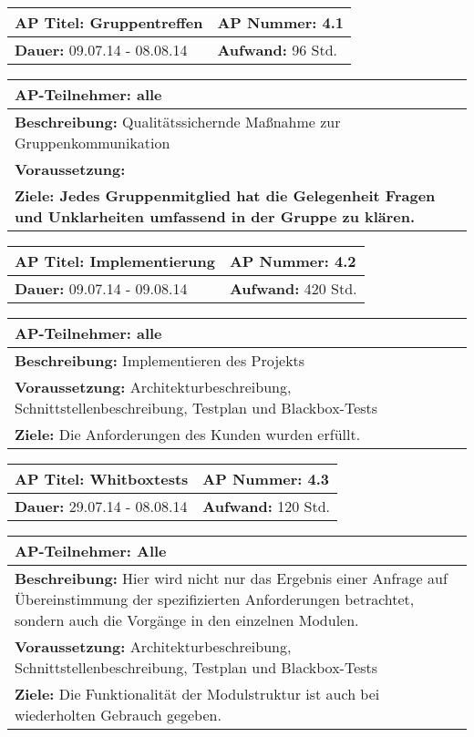 \begin{tabular}{|p{7.43cm}|p{7.43cm}|}
\hline
\textbf{AP Titel: }Gruppentreffen & \textbf{AP Nummer: }4.1\\ 
\hline
\textbf{Dauer: }09.07.14 - 08.08.14& \textbf{Aufwand: } 96 Std.\\
\hline
\end{tabular}
\begin{tabular}{|p{15.3cm}|}
\hline
\textbf{AP-Teilnehmer: }alle\\
\hline
\textbf{Beschreibung: }Qualitätssichernde Maßnahme zur Gruppenkommunikation\\
\hline
\textbf{Voraussetzung: } \\
\hline 
\textbf{Ziele: Jedes Gruppenmitglied hat die Gelegenheit Fragen und Unklarheiten umfassend in der Gruppe zu klären.}\\
\hline 
\end{tabular}

\begin{tabular}{|p{7.43cm}|p{7.43cm}|}
\hline
\textbf{AP Titel: }Implementierung & \textbf{AP Nummer: }4.2\\ 
\hline
\textbf{Dauer: }09.07.14 - 09.08.14& \textbf{Aufwand: } 420 Std.\\
\hline
\end{tabular}
\begin{tabular}{|p{15.3cm}|}
\hline
\textbf{AP-Teilnehmer: }alle\\
\hline
\textbf{Beschreibung: }Implementieren des Projekts\\
\hline
\textbf{Voraussetzung: }Architekturbeschreibung, Schnittstellenbeschreibung, Testplan und Blackbox-Tests \\
\hline 
\textbf{Ziele: }Die Anforderungen des Kunden wurden erfüllt.\\
\hline 
\end{tabular}

\begin{tabular}{|p{7.43cm}|p{7.43cm}|}
\hline
\textbf{AP Titel: }Whitboxtests & \textbf{AP Nummer: }4.3\\ 
\hline
\textbf{Dauer: }29.07.14 - 08.08.14& \textbf{Aufwand: } 120 Std.\\
\hline
\end{tabular}
\begin{tabular}{|p{15.3cm}|}
\hline
\textbf{AP-Teilnehmer: }Alle\\
\hline
\textbf{Beschreibung: }Hier wird nicht nur das Ergebnis einer Anfrage auf Übereinstimmung der spezifizierten Anforderungen betrachtet, sondern auch die Vorgänge 
in den einzelnen Modulen.\\
\hline
\textbf{Voraussetzung: }Architekturbeschreibung, Schnittstellenbeschreibung, Testplan und Blackbox-Tests \\
\hline 
\textbf{Ziele: }Die Funktionalität der Modulstruktur ist auch bei wiederholten Gebrauch gegeben.\\
\hline 
\end{tabular}

